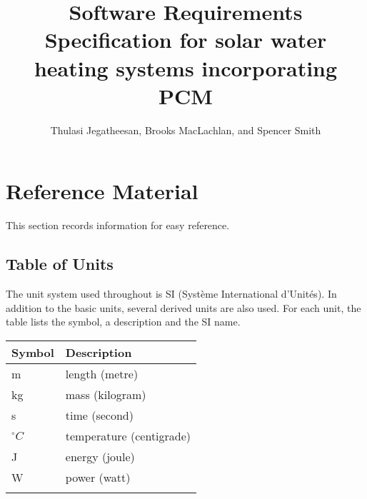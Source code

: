 \documentclass[12pt]{article}
\title{Software Requirements Specification for solar water heating systems incorporating PCM}
\author{Thulasi Jegatheesan, Brooks MacLachlan, and Spencer Smith}
\begin{document}
\maketitle
\tableofcontents
\newpage
\section{Reference Material}
\label{Sec:RM}
This section records information for easy reference.
\subsection{Table of Units}
\label{Sec:ToU}
The unit system used throughout is SI (Syst\`{e}me International d'Unit\'{e}s). In addition to the basic units, several derived units are also used. For each unit, the table lists the symbol, a description and the SI name.
\begin{longtable*}{l l}
\toprule
Symbol & Description
\\
\midrule
m & length (metre)
\\
kg & mass (kilogram)
\\
s & time (second)
\\
${}^{\circ}C$ & temperature (centigrade)
\\
J & energy (joule)
\\
W & power (watt)
\\
\bottomrule
\label{Table:ToU}
\end{longtable*}
\end{document}
